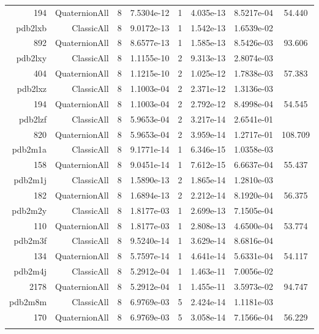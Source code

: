 \begin{xltabular}{\textwidth}{r|rcS[table-format=1.4e+2]cS[table-format=1.3e+2]S[table-format=1.4e+2]S[table-format=-1.3]}
194 & QuaternionAll & 8 & 7.5304e-12 & 1 & 4.035e-13 & 8.5217e-04 & 54.440\\  \addlinespace
pdb2lxb & ClassicAll & 8 & 9.0172e-13 & 1 & 1.542e-13 & 1.6539e-02 & \\
892 & QuaternionAll & 8 & 8.6577e-13 & 1 & 1.585e-13 & 8.5426e-03 & 93.606\\  \addlinespace
pdb2lxy & ClassicAll & 8 & 1.1155e-10 & 2 & 9.313e-13 & 2.8074e-03 & \\
404 & QuaternionAll & 8 & 1.1215e-10 & 2 & 1.025e-12 & 1.7838e-03 & 57.383\\  \addlinespace
pdb2lxz & ClassicAll & 8 & 1.1003e-04 & 2 & 2.371e-12 & 1.3136e-03 & \\
194 & QuaternionAll & 8 & 1.1003e-04 & 2 & 2.792e-12 & 8.4998e-04 & 54.545\\  \addlinespace
pdb2lzf & ClassicAll & 8 & 5.9653e-04 & 2 & 3.217e-14 & 2.6541e-01 & \\
820 & QuaternionAll & 8 & 5.9653e-04 & 2 & 3.959e-14 & 1.2717e-01 & 108.709\\  \addlinespace
pdb2m1a & ClassicAll & 8 & 9.1771e-14 & 1 & 6.346e-15 & 1.0358e-03 & \\
158 & QuaternionAll & 8 & 9.0451e-14 & 1 & 7.612e-15 & 6.6637e-04 & 55.437\\  \addlinespace
pdb2m1j & ClassicAll & 8 & 1.5890e-13 & 2 & 1.865e-14 & 1.2810e-03 & \\
182 & QuaternionAll & 8 & 1.6894e-13 & 2 & 2.212e-14 & 8.1920e-04 & 56.375\\  \addlinespace
pdb2m2y & ClassicAll & 8 & 1.8177e-03 & 1 & 2.699e-13 & 7.1505e-04 & \\
110 & QuaternionAll & 8 & 1.8177e-03 & 1 & 2.808e-13 & 4.6500e-04 & 53.774\\  \addlinespace
pdb2m3f & ClassicAll & 8 & 9.5240e-14 & 1 & 3.629e-14 & 8.6816e-04 & \\
134 & QuaternionAll & 8 & 5.7597e-14 & 1 & 4.641e-14 & 5.6331e-04 & 54.117\\  \addlinespace
pdb2m4j & ClassicAll & 8 & 5.2912e-04 & 1 & 1.463e-11 & 7.0056e-02 & \\
2178 & QuaternionAll & 8 & 5.2912e-04 & 1 & 1.455e-11 & 3.5973e-02 & 94.747\\  \addlinespace
pdb2m8m & ClassicAll & 8 & 6.9769e-03 & 5 & 2.424e-14 & 1.1181e-03 & \\
170 & QuaternionAll & 8 & 6.9769e-03 & 5 & 3.058e-14 & 7.1566e-04 & 56.229\\  \addlinespace

\end{xltabular}
